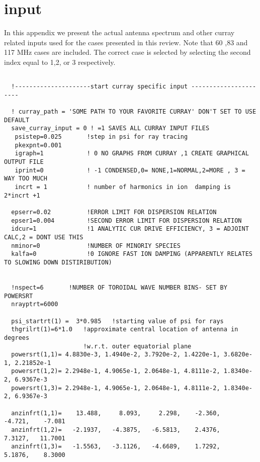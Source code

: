  \section{\ct input}
  In this appendix we present the actual antenna spectrum and other
  curray related inputs  used for the 
  cases presented in this review.  Note that 60 ,83 and 117 MHz cases
 are included. The correct case is selected by selecting   the second
 index equal to 1,2, or 3 respectively.
 \tiny
\begin{verbatim}

  !---------------------start curray specific input ----------------------

  ! curray_path = 'SOME PATH TO YOUR FAVORITE CURRAY' DON'T SET TO USE DEFAULT
  save_curray_input = 0 ! =1 SAVES ALL CURRAY INPUT FILES
   psistep=0.025       !step in psi for ray tracing
   pkexpnt=0.001
   igraph=1            ! 0 NO GRAPHS FROM CURRAY ,1 CREATE GRAPHICAL OUTPUT FILE
   iprint=0            ! -1 CONDENSED,0= NONE,1=NORMAL,2=MORE , 3 = WAY TOO MUCH
   incrt = 1           ! number of harmonics in ion  damping is 2*incrt +1 
  
  epserr=0.02          !ERROR LIMIT FOR DISPERSION RELATION
  epser1=0.004         !SECOND ERROR LIMIT FOR DISPERSION RELATION
  idcur=1              !1 ANALYTIC CUR DRIVE EFFICIENCY, 3 = ADJOINT CALC,2 = DONT USE THIS
  nminor=0             !NUMBER OF MINORIY SPECIES
  kalfa=0              !0 IGNORE FAST ION DAMPING (APPARENTLY RELATES TO SLOWING DOWN DISTIRIBUTION)


  !nspect=6       !NUMBER OF TOROIDAL WAVE NUMBER BINS- SET BY  POWERSRT
  nrayptrt=6000

  psi_startrt(1) =  3*0.985   !starting value of psi for rays
  thgrilrt(1)=6*1.0   !approximate central location of antenna in degrees
                      !w.r.t. outer equatorial plane
  powersrt(1,1)= 4.8830e-3, 1.4940e-2, 3.7920e-2, 1.4220e-1, 3.6820e-1, 2.21852e-1
  powersrt(1,2)= 2.2948e-1, 4.9065e-1, 2.0648e-1, 4.8111e-2, 1.8340e-2, 6.9367e-3
  powersrt(1,3)= 2.2948e-1, 4.9065e-1, 2.0648e-1, 4.8111e-2, 1.8340e-2, 6.9367e-3

  anzinfrt(1,1)=    13.488,     8.093,     2.298,    -2.360,    -4.721,    -7.081
  anzinfrt(1,2)=   -2.1937,   -4.3875,   -6.5813,    2.4376,    7.3127,   11.7001
  anzinfrt(1,3)=   -1.5563,   -3.1126,   -4.6689,    1.7292,    5.1876,    8.3000


\end{verbatim}
